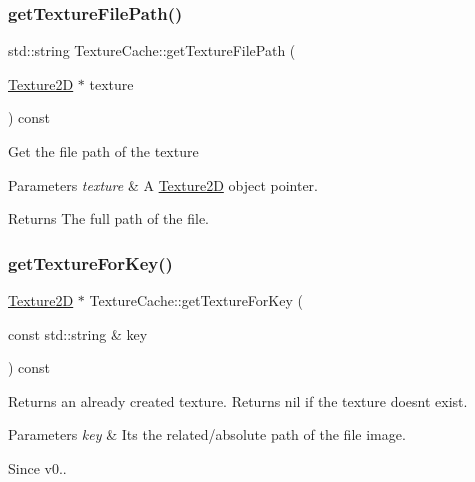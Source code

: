 \subsubsection{\texorpdfstring{get\+Texture\+File\+Path()}{getTextureFilePath()}\hspace{0.1cm}{\footnotesize\ttfamily [2/2]}}
{\footnotesize\ttfamily std\+::string Texture\+Cache\+::get\+Texture\+File\+Path (\begin{DoxyParamCaption}\item[{\hyperlink{classTexture2D}{Texture2D} $\ast$}]{texture }\end{DoxyParamCaption}) const}

Get the file path of the texture


\begin{DoxyParams}{Parameters}
{\em texture} & A \hyperlink{classTexture2D}{Texture2D} object pointer.\\
\hline
\end{DoxyParams}
\begin{DoxyReturn}{Returns}
The full path of the file. 
\end{DoxyReturn}
\mbox{\label{classTextureCache_a0fcfc44c403bb587c5883b0e587723d3}} 
\subsubsection{\texorpdfstring{get\+Texture\+For\+Key()}{getTextureForKey()}\hspace{0.1cm}{\footnotesize\ttfamily [1/2]}}
{\footnotesize\ttfamily \hyperlink{classTexture2D}{Texture2D} $\ast$ Texture\+Cache\+::get\+Texture\+For\+Key (\begin{DoxyParamCaption}\item[{const std\+::string \&}]{key }\end{DoxyParamCaption}) const}

Returns an already created texture. Returns nil if the texture doesn\textquotesingle{}t exist. 
\begin{DoxyParams}{Parameters}
{\em key} & It\textquotesingle{}s the related/absolute path of the file image. \\
\hline
\end{DoxyParams}
\begin{DoxySince}{Since}
v0.. 
\end{DoxySince}
\mbox{\label{classTextureCache_adb72cb7ee095134531ea8bd03588db94}} 
